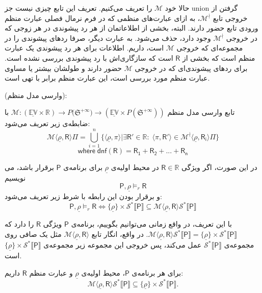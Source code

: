 حالا خود $\mathcal{M}$ را تعریف می‌کنیم. تعریف این تابع چیزی نیست جز \gls*{union} گرفتن از خروجی تابع $\mathcal{M}^\nmid$، به ازای عبارت‌های منظمی که در فرم نرمال فصلی عبارت منظم ورودی تابع حضور دارند. البته، بخشی از اطلاعاتمان از هر رد پیشوندی در هر زوجی که در خروجی $\mathcal{M}^\nmid$ وجود دارد، حذف می‌شود. به عبارت دیگر، صرفا ردهای پیشوندی را در مجموعه‌ای که خروجی $\mathcal{M}$ است، داریم. اطلاعات برای هر رد پیشوندی یک عبارت منظم است که بخشی از $\mathsf{R}$ است که سازگاری‌اش با رد پیشوندی بررسی نشده است. برای ردهای پیشوندی‌ای که در خروجی $\mathcal{M}$ حضور دارند و طولشان بیشتر یا مساوی عبارت منظم مورد بررسی است، این عبارت منظم برابر با تهی است.

\begin{defn}
(وارسی مدل منظم):

تابع وارسی مدل منظم 
$\mathcal{M}:\mathbb{(\underline{EV} \times R)} \rightarrow  \mathit{P}({\mathfrak{S}^{+\infty})}
\rightarrow (\mathbb{\underline{EV}} \times \mathit{P} (\mathfrak{S}^{+\infty} ) )$
با ضابطه‌ی زیر تعریف می‌شود:
$$\mathcal{M} \langle \underline{\rho} , \mathsf{R} \rangle \Pi= \bigcup_{i=1}^n \{  \langle \underline{\rho},\pi\rangle | \exists \mathsf{R'} \in \mathbb{R}:\; \langle \pi , \mathsf{R'} \rangle \in 
\mathcal{M}^\nmid \langle \underline{\rho}, \mathsf{R_i} \rangle \Pi \}$$
$$\mathsf{where \; dnf (R) = R_1 + R_2 + ... + R_n}$$ 



در این صورت، اگر ویژگی $\mathsf{R} \in \mathbb{R}$ در محیط اولیه‌ی $\underline{\rho}$ برای برنامه‌ی $\mathsf{P}$ برقرار باشد، می نویسیم
$$\mathsf{P} , \underline{\rho} \models_r \mathsf{R}$$
و برقرار بودن این رابطه با شرط زیر تعریف می‌شود:
$$\mathsf{P} , \underline{\rho} \models_r \mathsf{R} \iff \{\underline{\rho}\} \times \mathcal{S}^* \llbracket \mathsf{P} \rrbracket \subseteq \mathcal{M} \langle \underline{\rho} , \mathsf{R} \rangle \mathcal{S}^* \llbracket \mathsf{P} \rrbracket$$

\end{defn}

با این تعریف، در واقع زمانی می‌توانیم بگوییم، برنامه‌ی $\mathsf{P}$ ویژگی $\mathsf{R}$ را دارد \break که 
$\mathcal{M}\langle \underline{\rho} , \mathsf{R} \rangle \mathcal{S}^* \llbracket \mathsf{P} \rrbracket = 
\{\underline{\rho}\} \times \mathcal{S}^* \llbracket \mathsf{P} \rrbracket$.
در واقع، انگار تابع 
$\mathcal{M} \langle \underline{\rho} , \mathsf{R} \rangle$
مثل یک صافی روی مجموعه‌ی 
$\mathcal{S}^* \llbracket \mathsf{P} \rrbracket$
عمل می‌کند، پس خروجی این مجموعه زیر مجموعه‌ی $\{\underline{\rho}\} \times \mathcal{S}^* \llbracket \mathsf{P} \rrbracket$ است.
\begin{thm}
	برای هر برنامه‌ی $\mathsf{P}$، محیط اولیه‌ی $\underline{\rho}$ و عبارت منظم $\mathsf{R}$ داریم:
	$$\mathcal{M}\langle \underline{\rho},\mathsf{R} \rangle \mathcal{S}^* \llbracket \mathsf{P} \rrbracket \subseteq \{\underline{\rho}\} \times \mathcal{S}^* \llbracket \mathsf{P}\rrbracket.$$
\end{thm}

